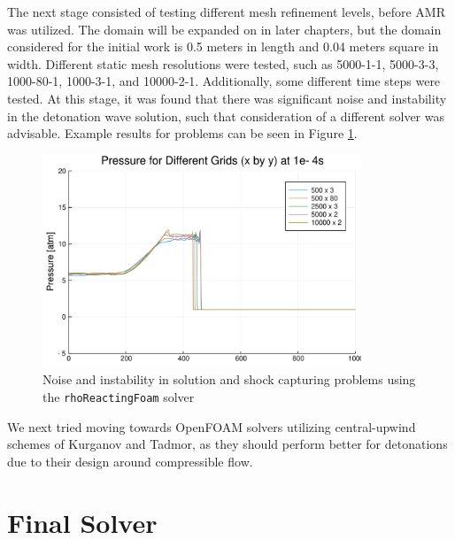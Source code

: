 The next stage consisted of testing different mesh refinement levels, before AMR was utilized. The domain will be expanded on in later chapters, but the domain considered for the initial work is 0.5 meters in length and 0.04 meters square in width. Different static mesh resolutions were tested, such as 5000-1-1, 5000-3-3, 1000-80-1, 1000-3-1, and 10000-2-1. Additionally, some different time steps were tested. At this stage, it was found that there was significant noise and instability in the detonation wave solution, such that consideration of a different solver was advisable. Example results for problems can be seen in Figure \ref{fig:rrf}. 
\begin{figure}[]
\centering
\includegraphics[width=0.85\textwidth]{./figs/rhoReactingFoam.png}
\caption{Noise and instability in solution and shock capturing problems using the \texttt{rhoReactingFoam} solver}
\label{fig:rrf}
\end{figure}%
\noindent We next tried moving towards OpenFOAM solvers utilizing central-upwind schemes of Kurganov and Tadmor, as they should perform better for detonations due to their design around compressible flow. 




\section{Final Solver}

